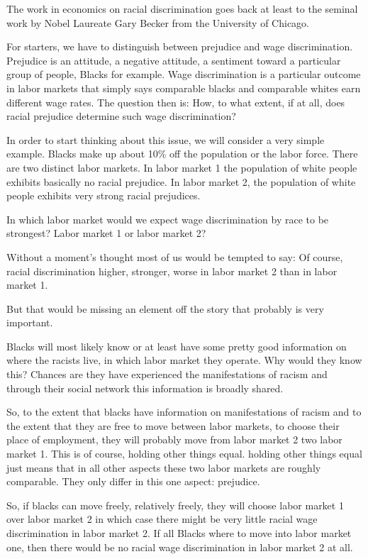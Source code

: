 \documentclass[
]{book}
\begin{document}
The work in economics on racial discrimination goes back at least to the seminal work by Nobel Laureate Gary Becker from the University of Chicago.

For starters, we have to distinguish between prejudice and wage discrimination. Prejudice is an attitude, a negative attitude, a sentiment toward a particular group of people, Blacks for example. Wage discrimination is a particular outcome in labor markets that simply says comparable blacks and comparable whites earn different wage rates.
The question then is: How, to what extent, if at all, does racial prejudice determine such wage discrimination?

In order to start thinking about this issue, we will consider a very simple example. Blacks make up about 10\% off the population or the labor force. There are two distinct labor markets. In labor market 1 the population of white people exhibits basically no racial prejudice. In labor market 2, the population of white people exhibits very strong racial prejudices.

In which labor market would we expect wage discrimination by race to be strongest? Labor market 1 or labor market 2?

Without a moment's thought most of us would be tempted to say: Of course, racial discrimination higher, stronger, worse in labor market 2 than in labor market 1.

But that would be missing an element off the story that probably is very important.

Blacks will most likely know or at least have some pretty good information on where the racists live, in which labor market they operate. Why would they know this? Chances are they have experienced the manifestations of racism and through their social network this information is broadly shared.

So, to the extent that blacks have information on manifestations of racism and to the extent that they are free to move between labor markets, to choose their place of employment, they will probably move from labor market 2 two labor market 1. This is of course, holding other things equal. holding other things equal just means that in all other aspects these two labor markets are roughly comparable. They only differ in this one aspect: prejudice.

So, if blacks can move freely, relatively freely, they will choose labor market 1 over labor market 2 in which case there might be very little racial wage discrimination in labor market 2. If all Blacks where to move into labor market one, then there would be no racial wage discrimination in labor market 2 at all.
\end{document}
